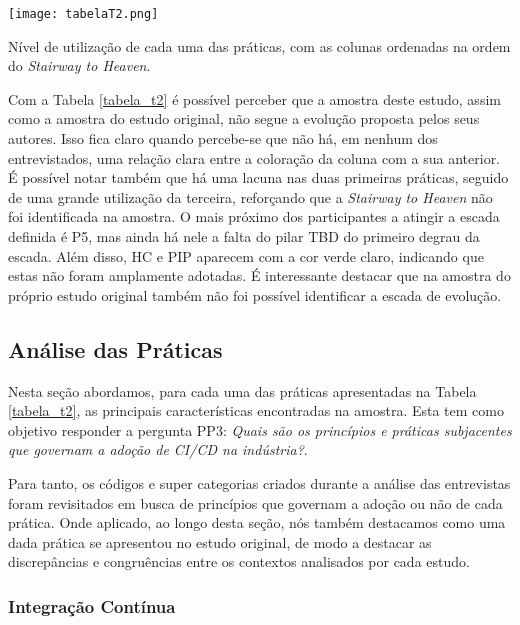 \begin{table}[ht]
\begin{center}
\texttt{[image: tabelaT2.png]}
\end{center}
\caption[Nível de utilização das práticas, com as colunas na ordem do \emph{Stairway to Heaven}]{
    Nível de utilização de cada uma das práticas, com as colunas ordenadas na ordem do \emph{Stairway to Heaven}.
}\label{tabela_t2}
\end{table}

Com a Tabela \ref{tabela_t2} é possível perceber que a amostra deste estudo, assim como a amostra do estudo original, não segue a evolução proposta pelos seus autores. Isso fica claro quando percebe-se que não há, em nenhum dos entrevistados, uma relação clara entre a coloração da coluna com a sua anterior. É possível notar também que há uma lacuna nas duas primeiras práticas, seguido de uma grande utilização da terceira, reforçando que a \emph{Stairway to Heaven} não foi identificada na amostra. O mais próximo dos participantes a atingir a escada definida é P5, mas ainda há nele a falta do pilar TBD do primeiro degrau da escada. Além disso, HC e PIP aparecem com a cor verde claro, indicando que estas não foram amplamente adotadas. É interessante destacar que na amostra do próprio estudo original também não foi possível identificar a escada de evolução.

\subsection{Análise das Práticas}

Nesta seção abordamos, para cada uma das práticas apresentadas na Tabela \ref{tabela_t2}, as principais características encontradas na amostra. Esta tem como objetivo responder a pergunta PP3: \emph{Quais são os princípios e práticas subjacentes que governam a adoção de CI/CD na indústria?}.

Para tanto, os códigos e super categorias criados durante a análise das entrevistas foram revisitados em busca de princípios que governam a adoção ou não de cada prática. Onde aplicado, ao longo desta seção, nós também destacamos como uma dada prática se apresentou no estudo original, de modo a destacar as discrepâncias e congruências entre os contextos analisados por cada estudo.

\subsubsection{Integração Contínua}

